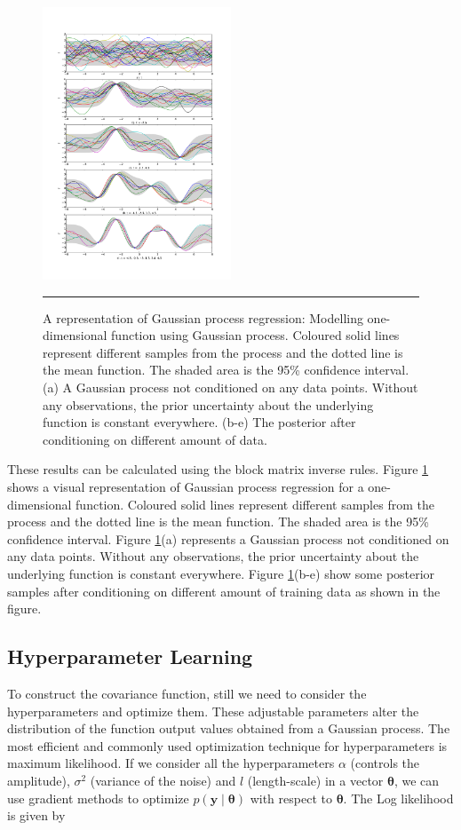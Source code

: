 \begin{figure}
	\centering
	\includegraphics[width=0.5\textwidth]{diagrams/gpreg.pdf}
	\rule{25em}{0.5pt}
	\caption[A representation of Gaussian process regression: Modelling one-dimensional function using Gaussian process]
	{A representation of Gaussian process regression: Modelling one-dimensional function using Gaussian process. Coloured solid lines represent different samples from the process and the dotted line is the mean function. The shaded area is the 95\% confidence interval. (a) A Gaussian process not conditioned on any data points. Without any observations, the prior uncertainty about the underlying function is constant everywhere. (b-e) The posterior after conditioning on different amount of data.}
	\label{fig:dempGPReg}
\end{figure}

These results can be calculated using the block matrix inverse rules. Figure \ref{fig:dempGPReg} shows a visual representation of Gaussian process regression for a one-dimensional function. Coloured solid lines represent different samples from the process and the dotted line is the mean function. The shaded area is the 95\% confidence interval. Figure \ref{fig:dempGPReg}(a) represents a Gaussian process not conditioned on any data points. Without any observations, the prior uncertainty about the underlying function is constant everywhere. Figure \ref{fig:dempGPReg}(b-e) show some posterior samples after conditioning on different amount of training data as shown in the figure. 

\subsection{Hyperparameter Learning}
To construct the covariance function, still we need to consider the hyperparameters and optimize them. These adjustable parameters alter the distribution of the function output values obtained from a Gaussian process. The most efficient and commonly used optimization technique for hyperparameters is maximum likelihood. If we consider all the hyperparameters $\alpha$ (controls the amplitude), $\sigma^2$ (variance of the noise) and $l$ (length-scale) in a vector $\boldsymbol{\theta}$, we can use gradient methods to optimize $p \left(\mathbf{y}\middle|\boldsymbol{\theta}\right)$ with respect to $\boldsymbol{\theta}$. The Log likelihood is given by

